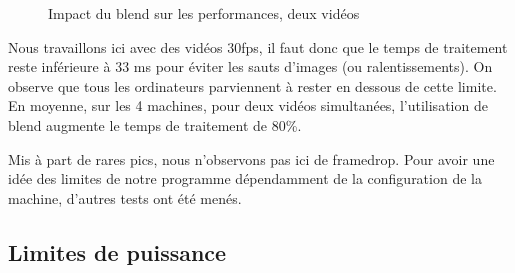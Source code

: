 \begin{figure}[H]%
    \centering
    \qquad
    \label{fig:timeCD}%
    \caption{Impact du blend sur les performances, deux vidéos}
\end{figure}

\newpage

Nous travaillons ici avec des vidéos 30fps, il faut donc que le
temps de traitement reste inférieure à 33 ms pour éviter les
sauts d'images (ou ralentissements). On observe que tous les
ordinateurs parviennent à rester en dessous de cette limite. En
moyenne, sur les 4 machines, pour deux vidéos simultanées,
l'utilisation de blend augmente le temps de traitement de 80\%. 
\bigskip

Mis à part de rares pics, nous n'observons pas ici de framedrop.
Pour avoir une idée des limites de notre programme dépendamment
de la configuration de la machine, d'autres tests ont été menés. 

\subsection{Limites de puissance}


